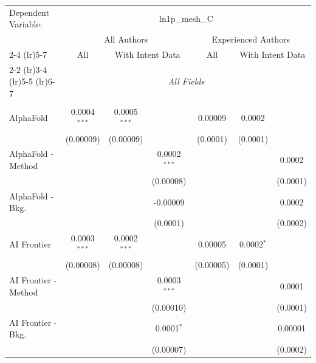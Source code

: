 \begingroup
\centering
\begin{tabular}{lcccccc}
   \tabularnewline \midrule \midrule
   Dependent Variable: & \multicolumn{6}{c}{ln1p\_mesh\_C}\\
 & \multicolumn{3}{c}{All Authors} & \multicolumn{3}{c}{Experienced Authors} \\
\cmidrule(lr){2-4} \cmidrule(lr){5-7}
 & \multicolumn{1}{c}{All} & \multicolumn{2}{c}{With Intent Data} & \multicolumn{1}{c}{All} & \multicolumn{2}{c}{With Intent Data} \\
\cmidrule(lr){2-2} \cmidrule(lr){3-4} \cmidrule(lr){5-5} \cmidrule(lr){6-7}
 & \multicolumn{6}{c}{\textit{All Fields}} \\ \\
   AlphaFold            & 0.0004$^{***}$  & 0.0005$^{***}$ &                & 0.00009    & 0.0002       &   \\   
                        & (0.00009)       & (0.00009)      &                & (0.0001)   & (0.0001)     &   \\   
   AlphaFold - Method   &                 &                & 0.0002$^{***}$ &            &              & 0.0002\\   
                        &                 &                & (0.00008)      &            &              & (0.0001)\\   
   AlphaFold - Bkg.     &                 &                & -0.00009       &            &              & 0.0002\\   
                        &                 &                & (0.0001)       &            &              & (0.0002)\\   
   AI Frontier          & 0.0003$^{***}$  & 0.0002$^{***}$ &                & 0.00005    & 0.0002$^{*}$ &   \\   
                        & (0.00008)       & (0.00008)      &                & (0.00005)  & (0.0001)     &   \\   
   AI Frontier - Method &                 &                & 0.0003$^{***}$ &            &              & 0.0001\\   
                        &                 &                & (0.00010)      &            &              & (0.0001)\\   
   AI Frontier - Bkg.   &                 &                & 0.0001$^{*}$   &            &              & 0.00001\\   
                        &                 &                & (0.00007)      &            &              & (0.0002)\\   

\end{tabular}
